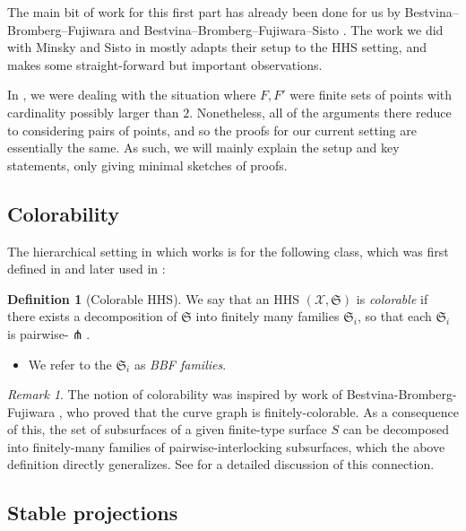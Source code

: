 \documentclass{amsart}
\theoremstyle{definition}
\newtheorem{definition}[theorem]{Definition}
\theoremstyle{remark}
\newtheorem{remark}[theorem]{Remark}
\theoremstyle{definition}
\newcommand{\calX}{\mathcal{X}}
\begin{document}
The main bit of work for this first part has already been done for us by Bestvina--Bromberg--Fujiwara \cite{BBF} and Bestvina--Bromberg--Fujiwara--Sisto \cite{BBFS}.  The work we did with Minsky and Sisto in \cite{DMS_bary} mostly adapts their setup to the HHS setting, and makes some straight-forward but important observations.

In \cite[Subsections 2.3 and 2.4]{DMS_bary}, we were dealing with the situation where $F,F'$ were finite sets of points with cardinality possibly larger than $2$.  Nonetheless, all of the arguments there reduce to considering pairs of points, and so the proofs for our current setting are essentially the same.  As such, we will mainly explain the setup and key statements, only giving minimal sketches of proofs.

\subsection{Colorability}

The hierarchical setting in which \cite{BBFS} works is for the following class, which was first defined in \cite[Definition 2.8]{DMS_bary} and later used in \cite{HP_proj,Petyt_quasicube}:

\begin{definition}[Colorable HHS]\label{defn:colorable}
We say that an HHS
$(\calX, \mathfrak S)$ is \emph{colorable} if there exists a decomposition of
$\mathfrak S$ into finitely many families $\mathfrak S_i$, so that each $\mathfrak S_i$ is
pairwise-$\pitchfork$.

\begin{itemize}
\item We refer to the $\mathfrak S_i$ as \emph{BBF families}.
\end{itemize}
\end{definition}

\begin{remark}
The notion of colorability was inspired by work of Bestvina-Bromberg-Fujiwara \cite{BBF}, who proved that the curve graph is finitely-colorable.  As a consequence of this, the set of subsurfaces of a given finite-type surface $S$ can be decomposed into finitely-many families of pairwise-interlocking subsurfaces, which the above definition directly generalizes.  See \cite[Subsection 2.3]{DMS_bary} for a detailed discussion of this connection.
\end{remark}

\subsection{Stable projections}
\end{document}
